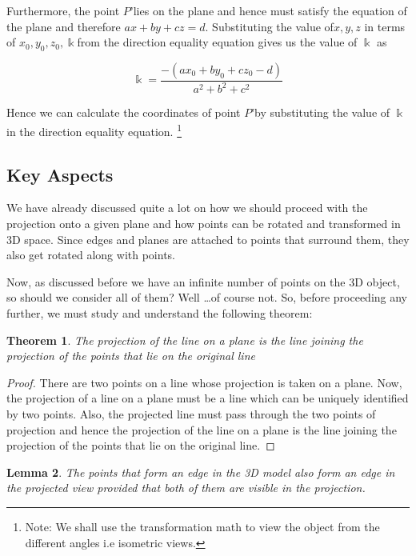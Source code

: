 \documentclass[12pt]{report}
\newtheorem{theorem}{Theorem}[section]
\newtheorem{lemma}[theorem]{Lemma}
\begin{document}
Furthermore, the point $P’ $lies on the plane and hence must satisfy the equation of the plane and therefore $ax + by + cz  = d$. Substituting the value of$ x,y,z$ in terms of $ x_{0},y_{0},z_{0}, \Bbbk $from the direction equality equation gives us the value of $\Bbbk$ as

\[ \Bbbk = \dfrac{ -(a x_{0} + b y_{0} + c z_{0} - d)}{ a^2 + b^2 + c^2 } \]

Hence we can calculate the coordinates of point $P’ $by substituting the value of $\Bbbk$ in the direction equality equation. \footnote{Note: We shall use the transformation math to view the object from the different angles i.e isometric views.}
\\

\subsection{Key Aspects}

We have already discussed quite a lot on how we should proceed with the projection onto a given plane and how points can be rotated and transformed in 3D space. Since edges and planes are attached to points that surround them, they also get rotated along with points.
\\
\vspace{0.3cm}

Now, as discussed before we have an infinite number of points on the 3D object, so should we consider all of them? Well \dots of course not. So, before proceeding any further, we must study and understand the following theorem:

\begin{theorem}
  The projection of the line on a plane is the line joining the projection of the points that lie on the original line
\end{theorem}

\begin{proof}
  There are two points on a line whose projection is taken on a plane. Now, the projection of a line on a plane must be a line which can be uniquely identified by two points. Also, the projected line must pass through the two points of projection and hence the projection of the line on a plane is the line joining the projection of the points that lie on the original line.
\end{proof}

\begin{lemma}
  \label{ingLemma}
  The points that form an edge in the 3D model also form an edge in the projected view provided that both of them are visible in the projection.
\end{lemma}
\end{document}
